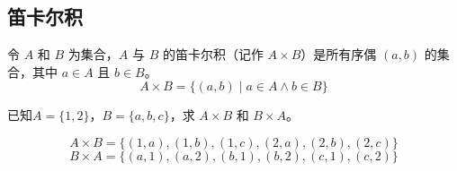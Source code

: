 \subsection{笛卡尔积}
\begin{definition}[笛卡尔积]\label{def:笛卡尔积}
    令 $A$ 和 $B$ 为集合，$A$ 与 $B$ 的笛卡尔积（记作 $A \times B$）是所有序偶 $(a,b)$ 的集合，其中 $a \in A$ 且 $b \in B$。
    \begin{equation*}
        A \times B = \{(a,b) \mid a \in A \land b \in B \}
    \end{equation*}
\end{definition}

\begin{collections}
    \begin{example}
        已知$A = \{1, 2\}$，$B = \{a, b, c\}$，求 $A \times B$ 和 $B \times A$。
    \end{example}
    \begin{solution}
        $$A \times B = \{(1, a), (1, b), (1, c), (2, a), (2, b), (2, c)\}$$
        $$B \times A = \{(a, 1), (a, 2), (b, 1), (b, 2), (c, 1), (c, 2)\}$$
    \end{solution}
\end{collections}

\newpage
